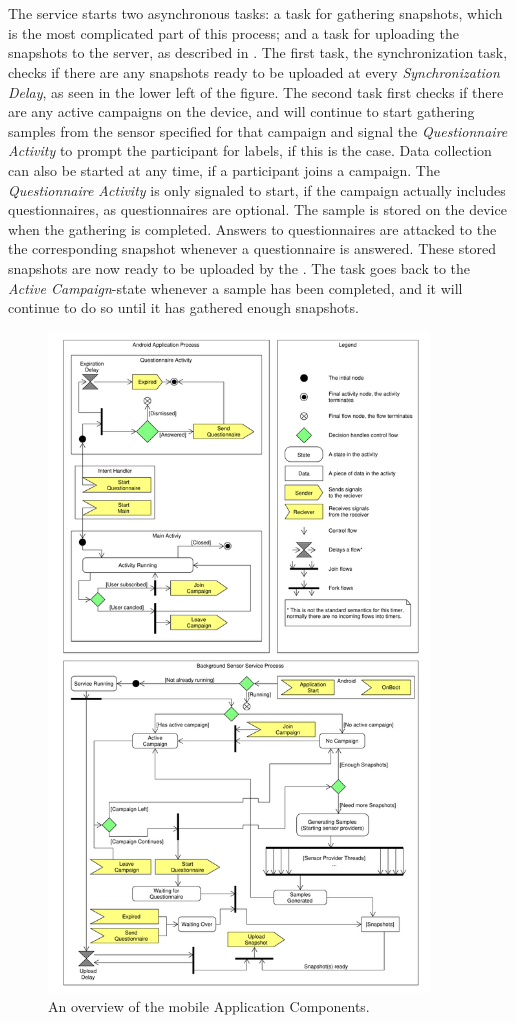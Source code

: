 \\\\
The service starts two asynchronous tasks: a task for gathering snapshots, which is the most complicated part of this process; and a task for uploading the snapshots to the server, as described in . The first task, the synchronization task, checks if there are any snapshots ready to be uploaded at every \emph{Synchronization Delay}, as seen in the lower left of the figure. The second task first checks if there are any active campaigns on the device, and will continue to start gathering samples from the sensor specified for that campaign and signal the \emph{Questionnaire Activity} to prompt the participant for labels, if this is the case. Data collection can also be started at any time, if a participant joins a campaign. The \emph{Questionnaire Activity} is only signaled to start, if the campaign actually includes questionnaires, as questionnaires are optional. The sample is stored on the device when the gathering is completed. Answers to questionnaires are attacked to the the corresponding snapshot whenever a questionnaire is answered. These stored snapshots are now ready to be uploaded by the . The task goes back to the \emph{Active Campaign}-state whenever a sample has been completed, and it will continue to do so until it has gathered enough snapshots.

\begin{figure}[!htbp]
    \centering
    \includegraphics[width=0.9\textwidth]{graphic/backgroundsensorservice/lifecyclestuff}
    \caption{An overview of the mobile Application Components.}
    \label{fig:system_currency_and_lifecycle}
\end{figure}
\FloatBarrier